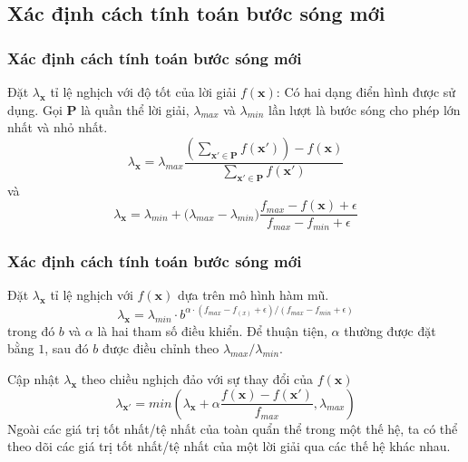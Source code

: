 \subsection{Xác định cách tính toán bước sóng mới}
\begin{frame}
    \frametitle{Xác định cách tính toán bước sóng mới}
    \begin{block}{Đặt $\lambda_{\mathbf{x}}$ tỉ lệ nghịch với độ tốt của lời giải $f(\mathbf{x})$:}
        Có hai dạng điển hình được sử dụng. Gọi $\mathbf{P}$ là quần thể lời giải, $\lambda_{max}$ và $\lambda_{min}$ lần lượt là bước sóng cho phép lớn nhất và nhỏ nhất.
        \begin{equation}
            \label{eq:e3}
            \lambda_{\mathbf{x}}=\lambda_{max}\frac{(\sum_{\mathbf{x'}\in\mathbf{P}}f(\mathbf{x}'))-f(\mathbf{x})}{\sum_{\mathbf{x'}\in\mathbf{P}}f(\mathbf{x}')}
        \end{equation}
        và
        \begin{equation}
            \label{eq:e4}
            \lambda_{\mathbf{x}} = \lambda_{min} + ({\lambda_{max} - \lambda_{min})\frac{f_{max} - f(\mathbf{x}) + \epsilon}{f_{max} - f_{min} + \epsilon}}
        \end{equation}
    \end{block}
\end{frame}

\begin{frame}
    \frametitle{Xác định cách tính toán bước sóng mới}
    \begin{block}{Đặt $\lambda_{\mathbf{x}}$ tỉ lệ nghịch với $f(\mathbf{x})$ dựa trên mô hình hàm mũ.}
        \begin{equation}
            \label{eq:e5}
            \lambda_{\mathbf{x}} = \lambda_{min} \cdot b^{\alpha \cdot (f_{max} - f_(x) + \epsilon)/(f_{max} - f_{min} + \epsilon)}
        \end{equation}
        trong đó $b$ và $\alpha$ là hai tham số điều khiển. Để thuận tiện, $\alpha$ thường được đặt bằng $1$, sau đó $b$ được điều chỉnh theo $\lambda_{max} / \lambda_{min}$.
    \end{block}
    \begin{block}{Cập nhật $\lambda_{\mathbf{x}}$ theo chiều nghịch đảo với sự thay đổi của $f(\mathbf{x})$}
        \begin{equation}
            \label{eq:e6}
            \lambda_{\mathbf{x'}} = min(\lambda_{\mathbf{x}} + \alpha \frac{f(\mathbf{x}) - f(\mathbf{x'})}{f_{max}}, \lambda_{max})
        \end{equation}
        Ngoài các giá trị tốt nhất/tệ nhất của toàn quẩn thể trong một thế hệ, ta có thể theo dõi các giá trị tốt nhất/tệ nhất của một lời giải qua các thế hệ khác nhau.
    \end{block}
\end{frame}


